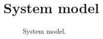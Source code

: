 \section{System model}
\label{sec: system_model}


\begin{figure}[tb]
    \centering
    \caption{System model.}
    \label{fig: system_model}
\end{figure}


